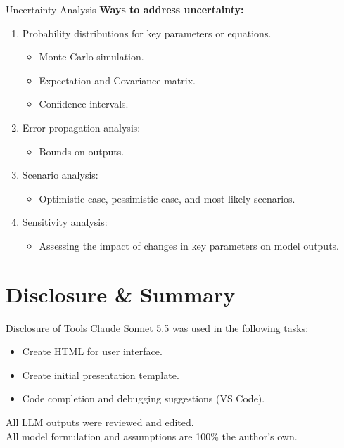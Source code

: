 \documentclass[aspectratio=169, 10pt]{beamer}
\begin{document}
\begin{frame}{Uncertainty Analysis}
    \textbf{Ways to address uncertainty:}
    \begin{enumerate}
        \item Probability distributions for key parameters or equations.
        \begin{itemize}
            \item Monte Carlo simulation.
            \item Expectation and Covariance matrix.
            \item Confidence intervals.
        \end{itemize}
        \item Error propagation analysis:
        \begin{itemize}
            \item Bounds on outputs.
        \end{itemize}
        \item Scenario analysis:
        \begin{itemize}
            \item Optimistic-case, pessimistic-case, and most-likely scenarios.
        \end{itemize}
        \item Sensitivity analysis:
        \begin{itemize}
            \item Assessing the impact of changes in key parameters on model outputs.
        \end{itemize}
    \end{enumerate}
\end{frame}


\section{Disclosure \& Summary}
\begin{frame}{Disclosure of Tools}
    Claude Sonnet 5.5 was used in the following tasks:
    \begin{itemize}
        \item Create HTML for user interface.
        \item Create initial presentation template.
        \item Code completion and debugging suggestions (VS Code).
    \end{itemize}
    \vspace{0.5cm}
    All LLM outputs were reviewed and edited.\\
    All model formulation and assumptions are 100\% the author's own.
\end{frame}
\end{document}
